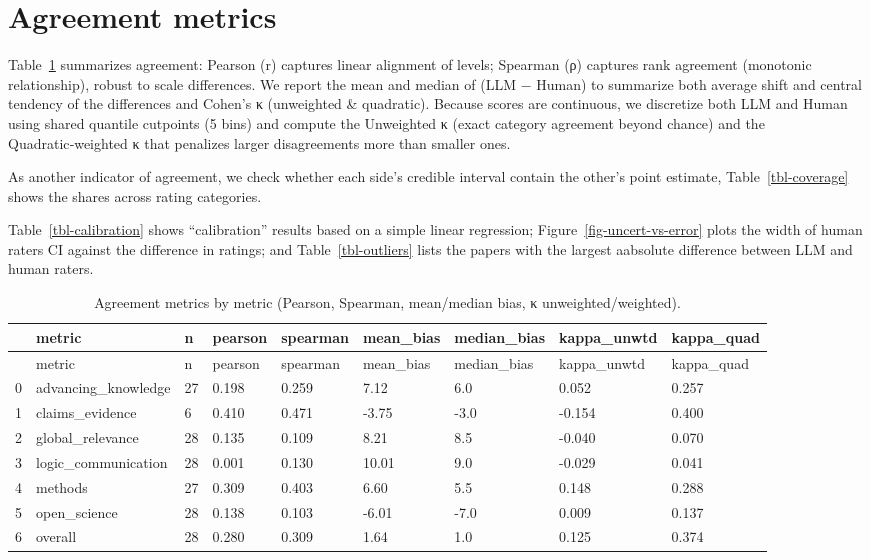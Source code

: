 \documentclass[
  11pt,
  letterpaper,
  DIV=11,
  numbers=noendperiod]{scrreprt}
\begin{document}
\hypertarget{agreement-metrics}{%
\section{Agreement metrics}\label{agreement-metrics}}

Table~\ref{tbl-agreement} summarizes agreement: Pearson (r) captures
linear alignment of levels; Spearman (ρ) captures rank agreement
(monotonic relationship), robust to scale differences. We report the
mean and median of (LLM − Human) to summarize both average shift and
central tendency of the differences and Cohen's κ (unweighted \&
quadratic). Because scores are continuous, we discretize both LLM and
Human using shared quantile cutpoints (5 bins) and compute the
Unweighted κ (exact category agreement beyond chance) and the
Quadratic‑weighted κ that penalizes larger disagreements more than
smaller ones.

As another indicator of agreement, we check whether each side's credible
interval contain the other's point estimate, Table~\ref{tbl-coverage}
shows the shares across rating categories.

Table~\ref{tbl-calibration} shows ``calibration'' results based on a
simple linear regression; Figure~\ref{fig-uncert-vs-error} plots the
width of human raters CI against the difference in ratings; and
Table~\ref{tbl-outliers} lists the papers with the largest aabsolute
difference between LLM and human raters.

\hypertarget{tbl-agreement}{}
\begin{longtable}[]{@{}lllllllll@{}}
\caption{\label{tbl-agreement}Agreement metrics by metric (Pearson,
Spearman, mean/median bias, κ unweighted/weighted).}\tabularnewline
\toprule()
& metric & n & pearson & spearman & mean\_bias & median\_bias &
kappa\_unwtd & kappa\_quad \\
\midrule()
\endfirsthead
\toprule()
& metric & n & pearson & spearman & mean\_bias & median\_bias &
kappa\_unwtd & kappa\_quad \\
\midrule()
\endhead
0 & advancing\_knowledge & 27 & 0.198 & 0.259 & 7.12 & 6.0 & 0.052 &
0.257 \\
1 & claims\_evidence & 6 & 0.410 & 0.471 & -3.75 & -3.0 & -0.154 &
0.400 \\
2 & global\_relevance & 28 & 0.135 & 0.109 & 8.21 & 8.5 & -0.040 &
0.070 \\
3 & logic\_communication & 28 & 0.001 & 0.130 & 10.01 & 9.0 & -0.029 &
0.041 \\
4 & methods & 27 & 0.309 & 0.403 & 6.60 & 5.5 & 0.148 & 0.288 \\
5 & open\_science & 28 & 0.138 & 0.103 & -6.01 & -7.0 & 0.009 & 0.137 \\
6 & overall & 28 & 0.280 & 0.309 & 1.64 & 1.0 & 0.125 & 0.374 \\
\bottomrule()
\end{longtable}
\end{document}
